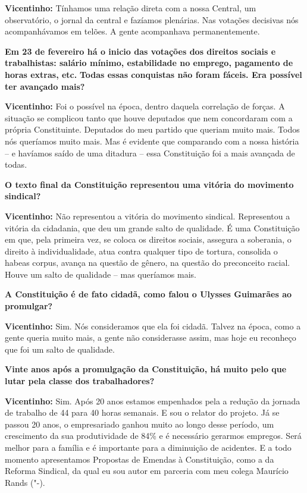 \textbf{Vicentinho:} Tínhamos uma relação direta com a nossa Central, um
observatório, o jornal da central e fazíamos plenárias. Nas votações
decisivas nós acompanhávamos em telões. A gente acompanhava
permanentemente.

\textbf{Em 23 de fevereiro há o inicio das votações dos direitos sociais
e trabalhistas: salário mínimo, estabilidade no emprego, pagamento de
horas extras, etc.} \textbf{Todas essas conquistas não foram fáceis. Era
possível ter avançado mais?}

\textbf{Vicentinho:} Foi o possível na época, dentro daquela correlação
de forças. A situação se complicou tanto que houve deputados que nem
concordaram com a própria Constituinte. Deputados do meu partido que
queriam muito mais. Todos nós queríamos muito mais. Mas é evidente que
comparando com a nossa história -- e havíamos saído de uma ditadura --
essa Constituição foi a mais avançada de todas.

\textbf{O texto final da Constituição representou uma vitória do
movimento sindical?}

\textbf{Vicentinho:} Não representou a vitória do movimento sindical.
Representou a vitória da cidadania, que deu um grande salto de
qualidade. É uma Constituição em que, pela primeira vez, se coloca os
direitos sociais, assegura a soberania, o direito à individualidade,
atua contra qualquer tipo de tortura, consolida o habeas corpus, avança
na questão de gênero, na questão do preconceito racial. Houve um salto
de qualidade -- mas queríamos mais.

\textbf{A Constituição é de fato cidadã, como falou o Ulysses Guimarães
ao promulgar?}

\textbf{Vicentinho:} Sim. Nós consideramos que ela foi cidadã. Talvez na
época, como a gente queria muito mais, a gente não considerasse assim,
mas hoje eu reconheço que foi um salto de qualidade.

\textbf{Vinte anos após a promulgação da Constituição, há muito pelo que
lutar pela classe dos trabalhadores?}

\textbf{Vicentinho:} Sim. Após 20 anos estamos empenhados pela a redução
da jornada de trabalho de 44 para 40 horas semanais. E sou o relator do
projeto. Já se passou 20 anos, o empresariado ganhou muito ao longo
desse período, um crescimento da sua produtividade de 84\% e é
necessário gerarmos empregos. Será melhor para a família e é importante
para a diminuição de acidentes. E a todo momento apresentamos Propostas
de Emendas à Constituição, como a  da Reforma Sindical, da qual eu
sou autor em parceria com meu colega Maurício Rands ("-).

